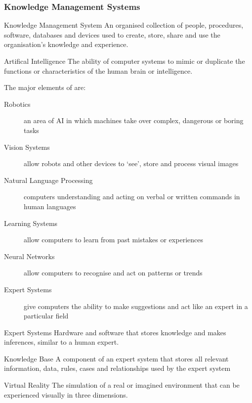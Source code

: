\documentclass[\main/notes.tex]{subfiles}
\begin{document}
				\subsubsection{Knowledge Management Systems}
					\begin{definition}{Knowledge Management System}
						An organised collection of people, procedures, software, databases and devices used to create, store, share and use the organisation's knowledge and experience.
					\end{definition}
					\begin{definition}{Artifical Intelligence}
						The ability of computer systems to mimic or duplicate the functions or characteristics of the human brain or intelligence.
					\end{definition}
					The major elements of  are:
					\begin{indentparagraph}
						\begin{description}
							\item[Robotics] an area of AI in which machines take over complex, dangerous or boring tasks
							\item[Vision Systems] allow robots and other devices to `see', store and process visual images
							\item[Natural Language Processing] computers understanding and acting on verbal or written commands in human languages
							\item[Learning Systems] allow computers to learn from past mistakes or experiences
							\item[Neural Networks] allow computers to recognise and act on patterns or trends
							\item[Expert Systems] give computers the ability to make suggestions and act like an expert in a particular field 
						\end{description}
					\end{indentparagraph}
					\begin{definition}{Expert Systems}
						Hardware and software that stores knowledge and makes inferences, similar to a human expert.
					\end{definition}
					\begin{definition}{Knowledge Base}
						A component of an expert system that stores all relevant information, data, rules, cases and relationships used by the expert system
					\end{definition}
					\begin{definition}{Virtual Reality}
						The simulation of a real or imagined environment that can be experienced visually in three dimensions.
					\end{definition}
			\pagebreak
\end{document}
